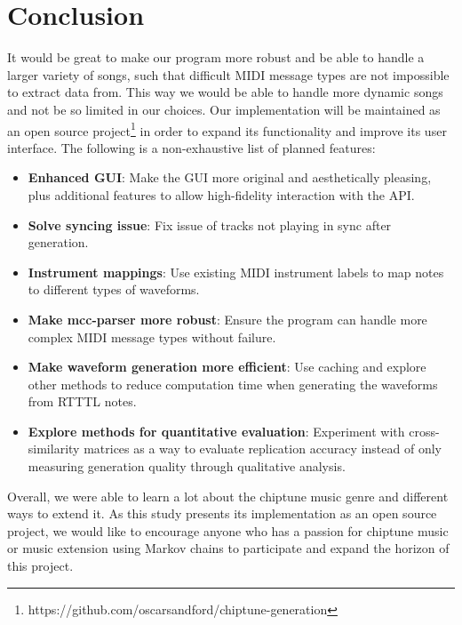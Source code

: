 \documentclass{article}
\begin{document}
\section{Conclusion} 
It would be great to make our program more robust and be able to handle a larger variety of songs, such that difficult MIDI message types are not impossible to extract
data from. This way we would be able to handle more dynamic songs and not be so limited in our choices. Our implementation will be maintained as an open source 
project\footnote{https://github.com/oscarsandford/chiptune-generation} in order to expand its functionality and improve its user interface. The following is a non-exhaustive 
list of planned features:
\begin{itemize}
  \item \textbf{Enhanced GUI}: Make the GUI more original and aesthetically pleasing, plus additional features to allow high-fidelity interaction with the API.
  \item \textbf{Solve syncing issue}: Fix issue of tracks not playing in sync after generation.
  \item \textbf{Instrument mappings}: Use existing MIDI instrument labels to map notes to different types of waveforms.
  \item \textbf{Make mcc-parser more robust}: Ensure the program can handle more complex MIDI message types without failure.
  \item \textbf{Make waveform generation more efficient}: Use caching and explore other methods to reduce computation time when generating the waveforms from RTTTL notes.
  \item \textbf{Explore methods for quantitative evaluation}: Experiment with cross-similarity matrices as a way to evaluate replication accuracy instead of only measuring 
  generation quality through qualitative analysis. 
\end{itemize}
Overall, we were able to learn a lot about the chiptune music genre and different ways to extend it. As this study presents its implementation as an open source project, 
we would like to encourage anyone who has a passion for chiptune music or music extension using Markov chains to participate and expand the horizon of this project.


\end{document}
